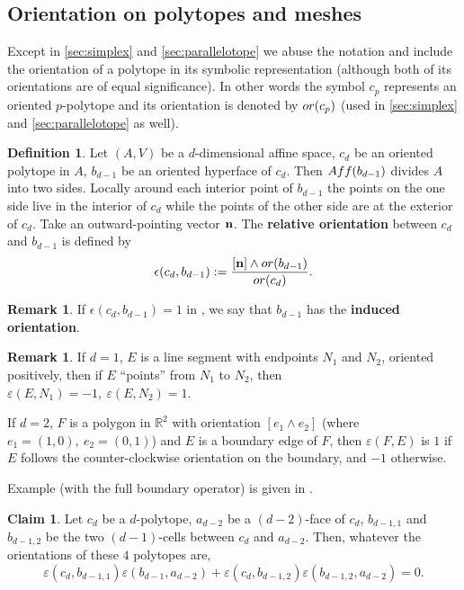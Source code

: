\documentclass{elsarticle}
\theoremstyle{definition}
\newtheorem{claim}[theorem]{Claim}
\newtheorem{definition}[theorem]{Definition}
\newtheorem{remark}[theorem]{Remark}
\newcommand{\R}{\mathbb{R}} %
\newcommand{\Aff}{\mathop{\rm Aff}\nolimits} %
\newcommand{\OR}{\mathop{\rm or}\nolimits}   %
\begin{document}
\subsection{Orientation on polytopes and meshes}
\label{sec:orientation_mesh}
Except in \ref{sec:simplex} and \ref{sec:parallelotope} we abuse the notation and include the orientation of a polytope in its symbolic representation (although both of its orientations are of equal significance). In other words the symbol $c_p$ represents an oriented $p$-polytope and its orientation is denoted by $\OR(c_p)$ (used in \ref{sec:simplex} and \ref{sec:parallelotope} as well).
\begin{definition}
\label{thm:orientation_relative}
  Let $(A, V)$ be a $d$-dimensional affine space, $c_d$ be an oriented polytope in $A$, $b_{d -1}$ be an oriented hyperface of $c_d$. Then $\Aff(b_{d - 1})$ divides $A$ into two sides. Locally around each interior point of $b_{d - 1}$ the points on the one side live in the interior of $c_d$ while the points of the other side are at the exterior of $c_d$. Take an outward-pointing vector ${\bf n}$. The \textbf{relative orientation} between $c_d$ and $b_{d -1}$ is defined by
  \begin{equation}
  \label{eq:orientation_relative}
    \epsilon(c_d, b_{d -1}) := \frac{[{\bf n}] \wedge \OR(b_{d - 1})}{\OR(c_d)}.
  \end{equation}
\end{definition}
\begin{remark}
  If $\epsilon(c_d, b_{d -1}) = 1$ in , we say that $b_{d - 1}$ has the \textbf{induced orientation}.
\end{remark}
\begin{remark}
  If $d = 1$, $E$ is a line segment with endpoints $N_1$ and $N_2$, oriented positively, then if $E$ ``points'' from $N_1$ to $N_2$, then $\varepsilon(E, N_1) = -1,\ \varepsilon(E, N_2) = 1$.
  
  If $d = 2$, $F$ is a polygon in $\R^2$ with orientation $[e_1 \wedge e_2]$ (where $e_1 = (1,0),\ e_2 = (0,1)$) and $E$ is a boundary edge of $F$, then $\varepsilon(F, E)$ is $1$ if $E$ follows the counter-clockwise orientation on the boundary, and $-1$ otherwise.
  
  Example (with the full boundary operator) is given in .
\end{remark}
\begin{claim}
\label{thm:orientation_main_property}
  Let $c_d$ be a $d$-polytope, $a_{d - 2}$ be a $(d - 2)$-face of $c_d$, $b_{d - 1, 1}$ and $b_{d - 1, 2}$ be the two $(d - 1)$-cells between $c_d$ and $a_{d - 2}$. Then, whatever the orientations of these $4$ polytopes are, 
  \begin{equation}
    \varepsilon(c_d, b_{d - 1, 1}) \varepsilon(b_{d - 1}, a_{d - 2})
    + \varepsilon(c_d, b_{d - 1, 2}) \varepsilon(b_{d - 1, 2}, a_{d - 2})
      = 0.
  \end{equation}
\end{claim}
\end{document}
